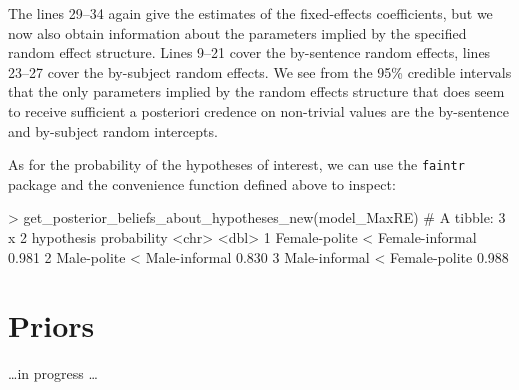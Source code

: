 \documentclass[nobib]{tufte-handout}
\begin{document}
The lines 29--34 again give the estimates of the fixed-effects coefficients, but we now also obtain information about the parameters implied by the specified random effect structure. Lines 9--21 cover the by-sentence random effects, lines 23--27 cover the by-subject random effects. We see from the 95\% credible intervals that the only parameters implied by the random effects structure that does seem to receive sufficient a posteriori credence on non-trivial values are the by-sentence and by-subject random intercepts.

As for the probability of the hypotheses of interest, we can use the \texttt{faintr} package and the convenience function defined above to inspect:

\medskip

\begin{minipage}[]{\textwidth}
\begin{rc}
> get_posterior_beliefs_about_hypotheses_new(model_MaxRE)
# A tibble: 3 x 2
  hypothesis                      probability
  <chr>                                 <dbl>
1 Female-polite < Female-informal       0.981
2 Male-polite < Male-informal           0.830
3 Male-informal < Female-polite         0.988
\end{rc}
\end{minipage}
\section{Priors}

\dots in progress \dots





\end{document}
